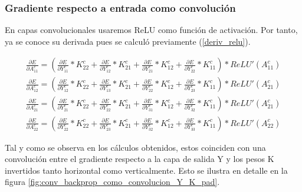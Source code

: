 \subsubsection{Gradiente respecto a entrada como convolución}

En capas convolucionales usaremos ReLU como función de activación. Por tanto, ya se conoce su derivada pues se calculó previamente (\ref{deriv_relu}).


\begin{gather}
	\frac{\partial E}{\partial A^c_{11}} = (\frac{\partial E}{\partial Y^c_{11}} * K^c_{22} + \frac{\partial E}{\partial Y^c_{12}} * K^c_{21} + \frac{\partial E}{\partial Y^c_{21}} * K^c_{12} + \frac{\partial E}{\partial Y^c_{22}} * K^c_{11}) *  ReLU'(A^c_{11}) \\
	\frac{\partial E}{\partial A^c_{12}} = (\frac{\partial E}{\partial Y^c_{12}} * K^c_{22} + \frac{\partial E}{\partial Y^c_{13}} * K^c_{21} + \frac{\partial E}{\partial Y^c_{22}} * K^c_{12} + \frac{\partial E}{\partial Y^c_{23}} * K^c_{11}) * ReLU'(A^c_{21}) \\
	\frac{\partial E}{\partial A^c_{21}} = (\frac{\partial E}{\partial Y^c_{21}} * K^c_{22} + \frac{\partial E}{\partial Y^c_{22}} * K^c_{21} + \frac{\partial E}{\partial Y^c_{31}} * K^c_{12} + \frac{\partial E}{\partial Y^c_{32}} * K^c_{11}) * ReLU'(A^c_{21}) \\
	\frac{\partial E}{\partial A^c_{22}} = (\frac{\partial E}{\partial Y^c_{22}} * K^c_{22} + \frac{\partial E}{\partial Y^c_{23}} * K^c_{21} + \frac{\partial E}{\partial Y^c_{32}} * K^c_{12} + \frac{\partial E}{\partial Y^c_{33}} * K^c_{11}) * ReLU'(A^c_{22})
\end{gather}

Tal y como se observa en los cálculos obtenidos, estos coinciden con una convolución entre el gradiente respecto a la capa de salida Y y los pesos K invertidos tanto horizontal como verticalmente. Esto se ilustra en detalle en la figura \ref{fig:conv_backprop_como_convolucion_Y_K_pad}.

